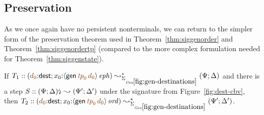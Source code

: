 \subsection{Preservation}

As we once again have no persistent nonterminals, we
can return to the simpler form of the preservation theorem used in
Theorem~\ref{thm:siggenorder} and Theorem~\ref{thm:siggenordertp}
(compared to the more complex formulation needed for
Theorem~\ref{thm:siggenstate}).

\medskip
\begin{theorem}
\label{thm:siggendests}
If $T_1 :: (\lf{d_0}{:}{\sf dest}; x_0{:}\iseph{\susp{{\sf gen}\,\lf{{\it tp}_0}\,\lf{d_0}}}) 
   \leadsto^*_{\siggendests} 
   (\Psi; \Delta)$ and there is a step
   $S :: {(\Psi; \Delta)}{\mbox{\lightning}}_{} \leadsto (\Psi'; \Delta')$
under the signature from Figure~\ref{fig:dest-cbv}, then
$T_2 :: (\lf{d_0}{:}{\sf dest}; x_0{:}\istrue{\susp{{\sf gen}\,\lf{{\it tp}_0}\,\lf{d_0}}}) 
   \leadsto^*_{\siggendests} 
   (\Psi'; \Delta')$.
\end{theorem}

